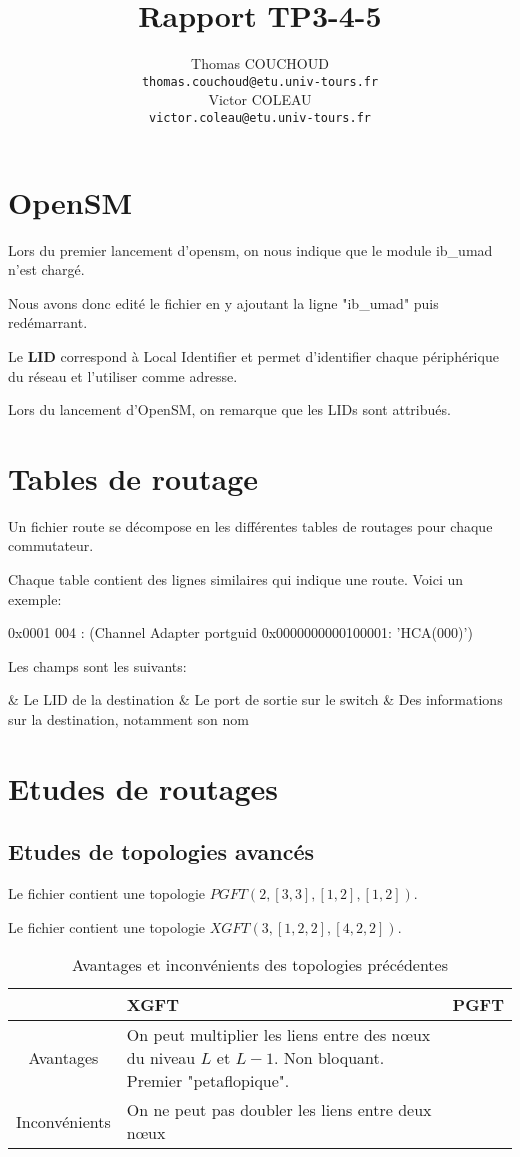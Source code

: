 \documentclass{report}
\title{Rapport TP3-4-5}
\author{Thomas COUCHOUD\\\texttt{thomas.couchoud@etu.univ-tours.fr}\\Victor COLEAU\\\texttt{victor.coleau@etu.univ-tours.fr}}
\begin{document}
	\mccTitle[no]
	\tableofcontents

	\chapter{OpenSM}
		Lors du premier lancement d'opensm, on nous indique que le module ib\_umad n'est chargé.
		
		Nous avons donc edité le fichier  en y ajoutant la ligne "ib\_umad" puis redémarrant.
		
		Le \textbf{LID} correspond à Local Identifier et permet d'identifier chaque périphérique du réseau et l'utiliser comme adresse.
		
		Lors du lancement d'OpenSM, on remarque que les LIDs sont attribués.
	
	\chapter{Tables de routage}
		Un fichier route se décompose en les différentes tables de routages pour chaque commutateur.
		
		Chaque table contient des lignes similaires qui indique une route. Voici un exemple:
		
		0x0001 004 : (Channel Adapter portguid 0x0000000000100001: 'HCA(000)')
		
		Les champs sont les suivants:
		\begin{easylist}
			& Le LID de la destination
			& Le port de sortie sur le switch
			& Des informations sur la destination, notamment son nom
		\end{easylist}

	
	\chapter{Etudes de routages}
		\section{Etudes de topologies avancés}
			Le fichier  contient une topologie $PGFT\left( 2,\left[ 3,3\right], \left[ 1,2\right], \left[ 1,2\right]\right)$.
			
			Le fichier  contient une topologie $XGFT\left( 3, \left[ 1,2,2\right], \left[ 4,2,2\right]\right)$.
			
			\begin{table}[H]%
				\begin{tabularx}{0.99\textwidth}{|c|X|X|}
					\hline
					& XGFT & PGFT\\\hline\endhead
					Avantages & On peut multiplier les liens entre des n\oe ux du niveau $L$ et $L-1$. Non bloquant. Premier "petaflopique".& \\\hline
					Inconvénients & On ne peut pas doubler les liens entre deux n\oe ux & \\\hline	
				\end{tabularx}
				\caption{Avantages et inconvénients des topologies précédentes}
			\end{table}
			
\end{document}
